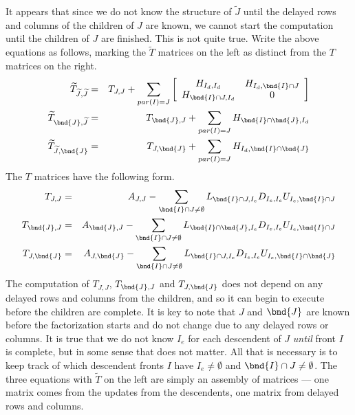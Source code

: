 It appears that since we do not know the structure of ${\widetilde J}$
until the delayed rows and columns of the children of $J$ are known, 
we cannot start the computation until the children of $J$ are finished.
This is not quite true.
Write the above equations as follows, marking the ${\widetilde T}$ 
matrices on the left as distinct from the $T$ matrices on the right.
\begin{eqnarray*}
{\widetilde T}_{{\widetilde J},{\widetilde J}} & = & T_{J,J}
+ \sum_{par(I) = J} 
\left \lbrack \begin{array}{cc}
H_{I_d, I_d} & H_{I_d, \bnd{I} \cap J} \\
H_{\bnd{I} \cap J, I_d} & 0 \\
\end{array} \right \rbrack
\\
{\widetilde T}_{\bnd{J},{\widetilde J}} & = & T_{\bnd{J},J}
+ \sum_{par(I) = J} H_{\bnd{I} \cap \bnd{J}, I_d}
\\
{\widetilde T}_{{\widetilde J},\bnd{J}} & = & T_{J,\bnd{J}}
+ \sum_{par(I) = J} H_{I_d, \bnd{I} \cap \bnd{J}}
\end{eqnarray*}
The $T$ matrices have the following form.
\begin{eqnarray*}
T_{J,J} & = & A_{J,J}
- \sum_{\bnd{I} \cap J \ne \emptyset} 
L_{\bnd{I} \cap J, I_e} 
D_{I_e, I_e} 
U_{I_e, \bnd{I} \cap J}
\\
T_{\bnd{J},J} & = & A_{\bnd{J},J}
- \sum_{\bnd{I} \cap J \ne \emptyset} 
L_{\bnd{I} \cap \bnd{J}, I_e} D_{I_e, I_e} U_{I_e, \bnd{I} \cap J}
\\
T_{J,\bnd{J}} & = & A_{J,\bnd{J}}
- \sum_{\bnd{I} \cap J \ne \emptyset} 
L_{\bnd{I} \cap J, I_e} D_{I_e, I_e} U_{I_e, \bnd{I} \cap \bnd{J}}
\end{eqnarray*}
The computation of $T_{J,J}$, $T_{\bnd{J},J}$ and $T_{J,\bnd{J}}$
does not depend on any delayed rows and columns from the children,
and so it can begin to execute before the children are complete.
It is key to note that $J$ and $\bnd{J}$ are known before the
factorization starts and do not change due to any delayed rows or
columns.
It is true that we do not know $I_e$ for each descendent of $J$
{\it until} front $I$ is complete, but in some sense that does not
matter.
All that is necessary is to keep track of which descendent fronts $I$ 
have $I_e \ne \emptyset$ and $\bnd{I} \cap J \ne \emptyset$.
The three equations with ${\widetilde T}$ on the left
are simply an assembly of matrices ---
one matrix comes from the updates from the descendents,
one matrix from delayed rows and columns.
